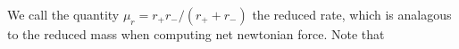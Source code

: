 We call the quantity \(\mu_r = r_+r_-/(r_+ + r_-)\) the reduced rate, which is analagous to the reduced mass when computing net newtonian force.  Note that